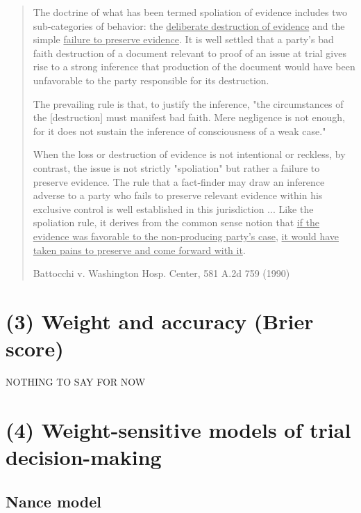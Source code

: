 \documentclass[
  10pt,
  dvipsnames,enabledeprecatedfontcommands]{scrartcl}
\begin{document}
\begin{quote}
The doctrine of what has been termed spoliation of evidence includes two sub-categories of behavior: the \underline{deliberate destruction of evidence} and the simple \underline{failure to preserve evidence}. It is well settled that a party's bad faith destruction of a document relevant to proof of an issue at trial gives rise to a strong inference that production of the document would have been unfavorable to the party responsible for its destruction. 

The prevailing rule is that, to justify the inference, "the circumstances of the [destruction] must manifest bad faith. Mere negligence is not enough, for it does not sustain the inference of consciousness of a weak case." 

When the loss or destruction of evidence is not intentional or reckless, by contrast, the issue is not strictly "spoliation" but rather a failure to preserve evidence. The rule that a fact-finder may draw an inference adverse to a party who fails to preserve relevant evidence within his exclusive control is well established in this jurisdiction ... Like the spoliation rule, it derives from the common sense notion that \underline{if the evidence was favorable to the non-producing party's case}, \underline{it would have taken pains to preserve and come forward with it}.

Battocchi v. Washington Hosp. Center, 581 A.2d 759 (1990)
\end{quote}

\hypertarget{weight-and-accuracy-brier-score}{%
\section{(3) Weight and accuracy (Brier
score)}\label{weight-and-accuracy-brier-score}}

NOTHING TO SAY FOR NOW

\hypertarget{weight-sensitive-models-of-trial-decision-making}{%
\section{(4) Weight-sensitive models of trial
decision-making}\label{weight-sensitive-models-of-trial-decision-making}}

\hypertarget{nance-model}{%
\subsection{Nance model}\label{nance-model}}
\end{document}
